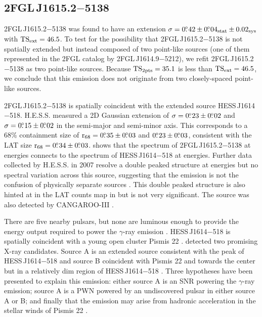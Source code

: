\subsection{2FGL\,J1615.2$-$5138}

2FGL\,J1615.2$-$5138 was found
 to have an extension $\sigma=0\mbox{$.\!\!^\circ$}42\pm0\mbox{$.\!\!^\circ$}04_\text{stat}\pm0.02_\text{sys}$
with $\mathrm{TS}_\mathrm{ext}=46.5$.
To test for the possibility that
2FGL\,J1615.2$-$5138 is not spatially extended but instead composed
of two point-like sources (one of them represented in the 2FGL catalog by
2FGL\,J1614.9$-$5212), we refit 2FGL\,J1615.2$-$5138 as two point-like
sources.  Because $\mathrm{TS}_{\mathrm{2pts}}=35.1$ is less than $\mathrm{TS}_\mathrm{ext}=46.5$, we conclude that
this emission does not originate from two closely-spaced point-like sources.

2FGL\,J1615.2$-$5138 is spatially coincident with 
the extended \tev source HESS\,J1614$-$518.
H.E.S.S. measured a 2D Gaussian extension of $\sigma=0\mbox{$.\!\!^\circ$}23\pm0\mbox{$.\!\!^\circ$}02$
and $\sigma=0\mbox{$.\!\!^\circ$}15\pm0\mbox{$.\!\!^\circ$}02$ in the semi-major and
semi-minor axis. This corresponds to a 68\% containment size of
${\mathrm{r}_{68}}=0\mbox{$.\!\!^\circ$}35\pm0\mbox{$.\!\!^\circ$}03$ and $0\mbox{$.\!\!^\circ$}23\pm0\mbox{$.\!\!^\circ$}03$,  consistent with
the LAT size ${\mathrm{r}_{68}}=0\mbox{$.\!\!^\circ$}34\pm0\mbox{$.\!\!^\circ$}03$.  
shows that the spectrum of 2FGL\,J1615.2$-$5138 at \gev energies connects
to the spectrum of HESS\,J1614$-$518 at \tev energies.  Further data
collected by H.E.S.S. in 2007 resolve a double peaked structure at
\tev energies but no spectral variation across this source, suggesting
that the emission is not the confusion of physically separate sources
\citep{rowell_2008a_closer-unidentified}.  This double peaked structure is
also hinted at in the LAT counts map in 
but is not very significant.  The \tev source was also detected by
CANGAROO-III \citep{mizukami_2011a_cangaroo-iii-observation}.

There are five nearby pulsars, but none are luminous enough to
provide the energy output required to power the $\gamma$-ray
emission \citep{rowell_2008a_closer-unidentified}.  HESS\,J1614$-$518
is spatially coincident with a young open cluster Pismis 22
\citep{landi_2007a_j1614-518:-detection,rowell_2008a_closer-unidentified}.  \suzaku detected
two promising X-ray candidates. Source A is an extended source consistent
with the peak of HESS\,J1614$-$518 and source B coincident with Pismis 22
and towards the center but in a relatively dim region of HESS\,J1614$-$518
\citep{matsumoto_2008a_discovery-extended}.  Three hypotheses have been presented to
explain this emission: either source A is an SNR powering the $\gamma$-ray
emission; source A is a PWN powered by an undiscovered pulsar in either
source A or B; and finally that the emission may arise from hadronic
acceleration in the stellar winds of Pismis 22 \citep{mizukami_2011a_cangaroo-iii-observation}.

